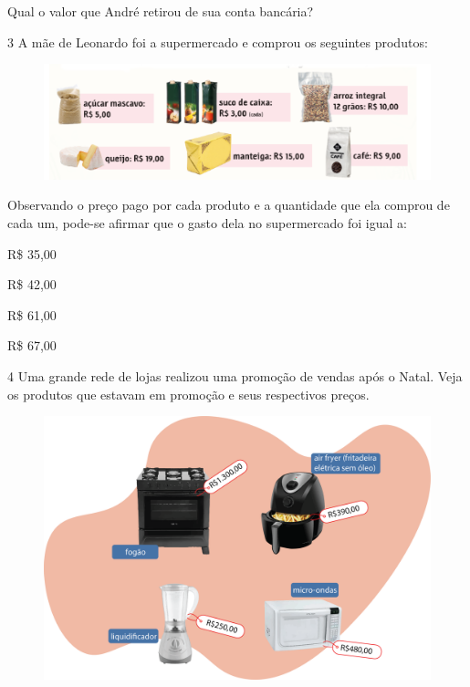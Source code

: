 Qual o valor que André retirou de sua conta bancária?


\pagebreak
\num{3} A mãe de Leonardo foi a supermercado e comprou os seguintes produtos:

\begin{figure}[htpb!]
\centering
\includegraphics[width=\textwidth]{./media/image66.png}
\end{figure}

Observando o preço pago por cada produto e a quantidade que ela comprou de cada um, pode-se afirmar que o gasto dela no supermercado foi igual a:

\begin{minipage}{.5\textwidth}
\begin{escolha}

\item
  R\$ 35,00
\item
  R\$ 42,00
\item
  R\$ 61,00
\item
  R\$ 67,00
\end{escolha}
\end{minipage}

\num{4} Uma grande rede de lojas realizou uma promoção de vendas após o Natal.
Veja os produtos que estavam em promoção e seus respectivos preços.

\begin{figure}[htpb!]
\centering
\includegraphics[width=.73\textwidth]{./media/image67.png}
\end{figure}

